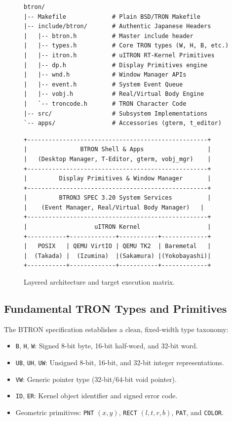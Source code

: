 \documentclass[10pt,journal,compsoc,twocolumn]{article}
\begin{document}
\begin{figure}[htbp]
\centering
\begin{minipage}{0.48\textwidth}
\begin{lstlisting}
btron/
|-- Makefile             # Plain BSD/TRON Makefile
|-- include/btron/       # Authentic Japanese Headers
|   |-- btron.h          # Master include header
|   |-- types.h          # Core TRON types (W, H, B, etc.)
|   |-- itron.h          # uITRON RT-Kernel Primitives
|   |-- dp.h             # Display Primitives engine
|   |-- wnd.h            # Window Manager APIs
|   |-- event.h          # System Event Queue
|   |-- vobj.h           # Real/Virtual Body Engine
|   `-- troncode.h       # TRON Character Code
|-- src/                 # Subsystem Implementations
`-- apps/                # Accessories (gterm, t_editor)
\end{lstlisting}
\caption{Authentic BTRON subsystem and header tree structure.}
\label{fig:source_tree}
\end{minipage}\hfill
\begin{minipage}{0.48\textwidth}
\begin{lstlisting}
+---------------------------------------------------+
|               BTRON Shell & Apps                  |
|   (Desktop Manager, T-Editor, gterm, vobj_mgr)    |
+---------------------------------------------------+
|         Display Primitives & Window Manager       |
+---------------------------------------------------+
|         BTRON3 SPEC 3.20 System Services          |
|    (Event Manager, Real/Virtual Body Manager)   |
+---------------------------------------------------+
|                   uITRON Kernel                   |
+-----------+-------------+-----------+-------------+
|   POSIX   | QEMU VirtIO | QEMU TK2  | Baremetal   |
|  (Takada) |  (Izumina)  |(Sakamura) |(Yokobayashi)|
+-----------+-------------+-----------+-------------+
\end{lstlisting}
\caption{Layered architecture and target execution matrix.}
\label{fig:arch_layers}
\end{minipage}
\end{figure}

\subsection{Fundamental TRON Types and Primitives}
The BTRON specification establishes a clean, fixed-width type taxonomy:
\begin{itemize}[leftmargin=*]
    \item \texttt{B}, \texttt{H}, \texttt{W}: Signed 8-bit byte, 16-bit half-word, and 32-bit word.
    \item \texttt{UB}, \texttt{UH}, \texttt{UW}: Unsigned 8-bit, 16-bit, and 32-bit integer representations.
    \item \texttt{VW}: Generic pointer type ($32$-bit/$64$-bit void pointer).
    \item \texttt{ID}, \texttt{ER}: Kernel object identifier and signed error code.
    \item Geometric primitives: \texttt{PNT} $(x, y)$, \texttt{RECT} $(l, t, r, b)$, \texttt{PAT}, and \texttt{COLOR}.
\end{itemize}
\end{document}
